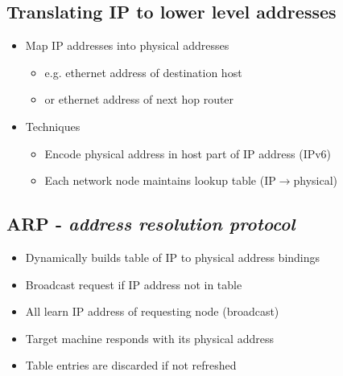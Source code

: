\subsection{Translating IP to lower level addresses}
\begin{itemize}[nosep]
    \item Map IP addresses into physical addresses
          \begin{itemize}[nosep]
              \item e.g. ethernet address of destination host
              \item or ethernet address of next hop router
          \end{itemize}
    \item Techniques
          \begin{itemize}[nosep]
              \item Encode physical address in host part of IP address (IPv6)
              \item Each network node maintains lookup table (IP$\to$physical)
          \end{itemize}
\end{itemize}

\subsection{ARP - \textit{address resolution protocol}}
\begin{itemize}[nosep]
    \item Dynamically builds table of IP to physical address bindings
    \item Broadcast request if IP address not in table
    \item All learn IP address of requesting node (broadcast)
    \item Target machine responds with its physical address
    \item Table entries are discarded if not refreshed
\end{itemize}

